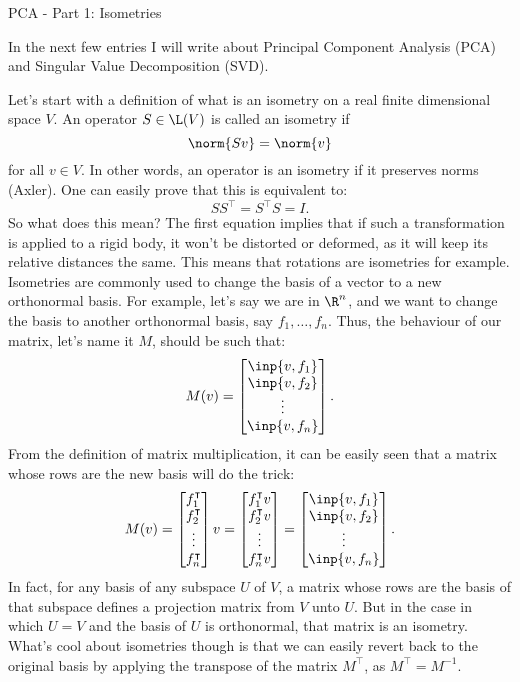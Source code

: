 \begin{entry}[2]{PCA - Part 1: Isometries }

\begin{entrysection}
In the next few entries I will write about Principal Component Analysis (PCA) and Singular Value Decomposition (SVD).
\end{entrysection}

\begin{entrysection}
Let's start with a definition of what is an isometry on a real finite dimensional space $V$. An operator $S \in \L(V)$ is called an isometry if 
\[ \norm{Sv} = \norm{v} \]
for all $v \in V$. In other words, an operator is an isometry if it preserves norms (Axler). One can easily prove that this is equivalent to:
\[ SS^{\intercal} = S^{\intercal}S = I. \]
So what does this mean? The first equation implies that if such a transformation is applied to a rigid body, it won't be distorted or deformed, as it will keep its relative distances the same. This means that rotations are isometries for example.\\

\noindent Isometries are commonly used to change the basis of a vector to a new orthonormal basis. For example, let's say we are in $\R^n$, and we want to change the basis to another orthonormal basis, say 
$f_1, \ldots, f_n.$
Thus, the behaviour of our matrix, let's name it $M$, should be such that:
\[ M(v) =  \begin{bmatrix}\inp{v, f_1}\\\inp{v, f_2}\\\vdots\\\inp{v, f_n} \end{bmatrix}.\]
From the definition of matrix multiplication, it can be easily seen that a matrix whose rows are the new basis will do the trick:
\[ M(v) = \begin{bmatrix} f_1^\intercal\\ f_2^\intercal\\\vdots\\ f_n^\intercal \end{bmatrix}v = \begin{bmatrix}f_1^\intercal v\\f_2^\intercal v\\\vdots\\f_n^\intercal v \end{bmatrix} = 
\begin{bmatrix}\inp{v, f_1}\\\inp{v, f_2}\\\vdots\\\inp{v, f_n} \end{bmatrix}.\] 
In fact, for any basis of any subspace $U$ of $V$, a matrix whose rows are the basis of that subspace defines a projection matrix from $V$ unto $U$. But in the case in which $U = V$ and the basis of $U$ is orthonormal, that matrix is an isometry. What's cool about isometries though is that we can easily revert back to the original basis by applying the transpose of the matrix $M^{\intercal}$, as $M^{\intercal} = M^{-1}$.
\end{entrysection}

\end{entry}
